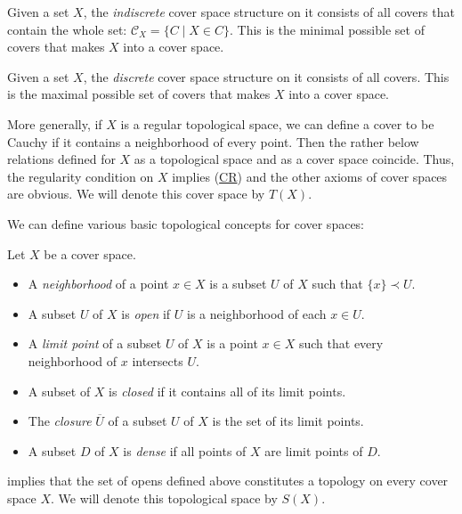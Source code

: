 \documentclass[reqno]{amsart}
\newcommand{\axref}[1]{(\hyperref[ax:#1]{#1})}
\theoremstyle{definition}
\theoremstyle{remark}
\numberwithin{figure}{section}
\newcommand{\rb}{\prec}
\begin{document}
\begin{example}
Given a set $X$, the \emph{indiscrete} cover space structure on it consists of all covers that contain the whole set: $\mathcal{C}_X = \{ C \mid X \in C \}$.
This is the minimal possible set of covers that makes $X$ into a cover space.
\end{example}

\begin{example}
Given a set $X$, the \emph{discrete} cover space structure on it consists of all covers.
This is the maximal possible set of covers that makes $X$ into a cover space.
\end{example}

\begin{example}
More generally, if $X$ is a regular topological space, we can define a cover to be Cauchy if it contains a neighborhood of every point.
Then the rather below relations defined for $X$ as a topological space and as a cover space coincide.
Thus, the regularity condition on $X$ implies \axref{CR} and the other axioms of cover spaces are obvious.
We will denote this cover space by $T(X)$.
\end{example}

We can define various basic topological concepts for cover spaces:

\begin{defn}
Let $X$ be a cover space.
\begin{itemize}
\item A \emph{neighborhood} of a point $x \in X$ is a subset $U$ of $X$ such that $\{ x \} \rb U$.
\item A subset $U$ of $X$ is \emph{open} if $U$ is a neighborhood of each $x \in U$.
\item A \emph{limit point} of a subset $U$ of $X$ is a point $x \in X$ such that every neighborhood of $x$ intersects $U$.
\item A subset of $X$ is \emph{closed} if it contains all of its limit points.
\item The \emph{closure} $\overline{U}$ of a subset $U$ of $X$ is the set of its limit points.
\item A subset $D$ of $X$ is \emph{dense} if all points of $X$ are limit points of $D$.
\end{itemize}
\end{defn}

 implies that the set of opens defined above constitutes a topology on every cover space $X$.
We will denote this topological space by $S(X)$.
\end{document}
